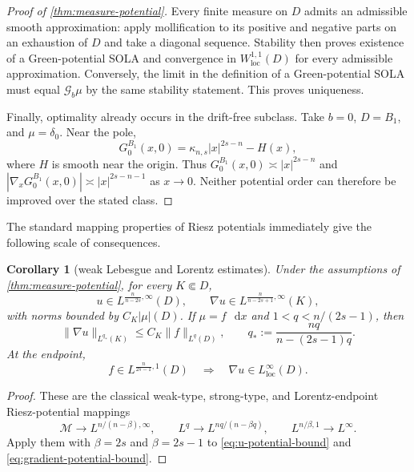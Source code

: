 \documentclass[reqno]{amsart}
\numberwithin{equation}{section}
\theoremstyle{plain}
\newtheorem{corollary}[theorem]{Corollary}
\theoremstyle{definition}
\theoremstyle{remark}
\newcommand{\M}{\mathcal M}
\newcommand{\differential}{\mathop{}\!\mathrm d}
\begin{document}
\begin{proof}[Proof of \cref{thm:measure-potential}]
Every finite measure on $D$ admits an admissible smooth approximation:
apply mollification to its positive and negative parts on an exhaustion of
$D$ and take a diagonal sequence.  Stability then proves existence of a
Green-potential SOLA and convergence in
$W^{1,1}_{\mathrm{loc}}(D)$ for every admissible approximation.  Conversely,
the limit in the definition of a Green-potential SOLA must equal
$\mathcal G_b\mu$ by the same stability statement.  This proves uniqueness.

Finally, optimality already occurs in the drift-free subclass.  Take
$b=0$, $D=B_1$, and $\mu=\delta_0$.  Near the pole,
\[
 G_0^{B_1}(x,0)=\kappa_{n,s}|x|^{2s-n}-H(x),
\]
where $H$ is smooth near the origin.  Thus
$G_0^{B_1}(x,0)\asymp|x|^{2s-n}$ and
$|\nabla_xG_0^{B_1}(x,0)|\asymp|x|^{2s-n-1}$ as $x\to0$.
Neither potential order can therefore be improved over the stated class.
\endgroup
\end{proof}

The standard mapping properties of Riesz potentials immediately give the
following scale of consequences.

\begin{corollary}[weak Lebesgue and Lorentz estimates]
\label{cor:measure-mapping}
Under the assumptions of \cref{thm:measure-potential}, for every
$K\Subset D$,
\begin{equation}\label{eq:weak-estimates}
 u\in L^{\frac n{n-2s},\infty}(D),\qquad
 \nabla u\in L^{\frac n{n-2s+1},\infty}(K),
\end{equation}
with norms bounded by $C_K|\mu|(D)$.  If $\mu=f\,\differential x$ and
$1<q<n/(2s-1)$, then
\begin{equation}\label{eq:strong-gradient-mapping}
 \|\nabla u\|_{L^{q_*}(K)}\le C_K\|f\|_{L^q(D)},
 \qquad q_*:=\frac{nq}{n-(2s-1)q}.
\end{equation}
At the endpoint,
\begin{equation}\label{eq:lorentz-endpoint}
 f\in L^{\frac n{2s-1},1}(D)
 \quad\Longrightarrow\quad
 \nabla u\in L^\infty_{\mathrm{loc}}(D).
\end{equation}
\end{corollary}

\begin{proof}
These are the classical weak-type, strong-type, and Lorentz-endpoint
Riesz-potential mappings
\[
 \M\longrightarrow L^{n/(n-\beta),\infty},\qquad
 L^q\longrightarrow L^{nq/(n-\beta q)},\qquad
 L^{n/\beta,1}\longrightarrow L^\infty.
\]
Apply them with $\beta=2s$ and
$\beta=2s-1$ to \eqref{eq:u-potential-bound} and
\eqref{eq:gradient-potential-bound}.
\end{proof}
\end{document}
